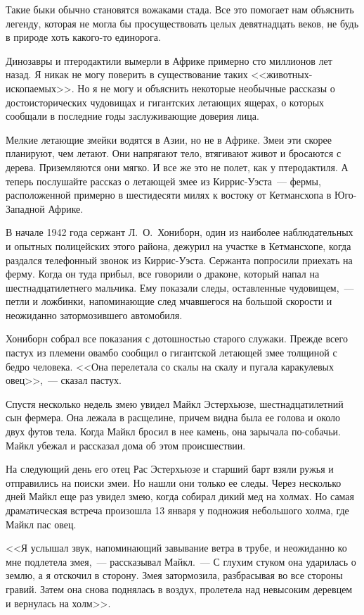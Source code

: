 \documentclass[12pt,a4paper,twoside,openany,svgnames]{memoir}
\begin{document}
Такие быки обычно становятся вожаками стада. Все это помогает нам объяснить легенду, которая не могла бы просуществовать целых девятнадцать веков, не будь в природе хоть какого-то единорога.

Динозавры и птеродактили вымерли в Африке примерно сто миллионов лет назад. Я никак не могу поверить в существование таких <<животных-ископаемых>>. Но я не могу и объяснить некоторые необычные рассказы о достоисторических чудовищах и гигантских летающих ящерах, о которых сообщали в последние годы заслуживающие доверия лица.

Мелкие летающие змейки водятся в Азии, но не в Африке. Змеи эти скорее планируют, чем летают. Они напрягают тело, втягивают живот и бросаются с дерева. Приземляются они мягко. И все же это не полет, как у птеродактиля. А теперь послушайте рассказ о летающей змее из Киррис-Уэста~--- фермы, расположенной примерно в шестидесяти милях к востоку от Кетмансхопа в Юго-Западной Африке.

В начале 1942 года сержант Л.~О.~Хониборн, один из наиболее наблюдательных и опытных полицейских этого района, дежурил на участке в Кетмансхопе, когда раздался телефонный звонок из Киррис-Уэста. Сержанта попросили приехать на ферму. Когда он туда прибыл, все говорили о драконе, который напал на шестнадцатилетнего мальчика. Ему показали следы, оставленные чудовищем,~--- петли и ложбинки, напоминающие след мчавшегося на большой скорости и неожиданно затормозившего автомобиля.

Хониборн собрал все показания с дотошностью старого служаки. Прежде всего пастух из племени овамбо сообщил о гигантской летающей змее толщиной с бедро человека. <<Она перелетала со скалы на скалу и пугала каракулевых овец>>,~--- сказал пастух.

Спустя несколько недель змею увидел Майкл Эстерхьюзе, шестнадцатилетний сын фермера. Она лежала в расщелине, причем видна была ее голова и около двух футов тела. Когда Майкл бросил в нее камень, она зарычала по-собачьи. Майкл убежал и рассказал дома об этом происшествии.

На следующий день его отец Рас Эстерхьюзе и старший барт взяли ружья и отправились на поиски змеи. Но нашли они только ее следы. Через несколько дней Майкл еще раз увидел змею, когда собирал дикий мед на холмах. Но самая драматическая встреча произошла 13 января у подножия небольшого холма, где Майкл пас овец.

<<Я услышал звук, напоминающий завывание ветра в трубе, и неожиданно ко мне подлетела змея,~--- рассказывал Майкл.~--- С глухим стуком она ударилась о землю, а я отскочил в сторону. Змея затормозила, разбрасывая во все стороны гравий. Затем она снова поднялась в воздух, пролетела над невысоким деревцем и вернулась на холм>>.
\end{document}

